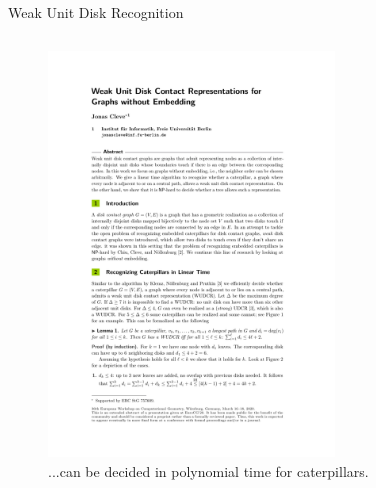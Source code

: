 \documentclass[aspectratio=169,notes]{beamer}
\begin{document}
\begin{frame}{Weak Unit Disk Recognition}

\begin{columns}
\begin{column}{0.4\textwidth}
    \begin{figure}
       \centering
       \includegraphics[width=0.8\textwidth,page=2,viewport=260 695 350 745,clip]{papers/Cleve2020-WUDC.pdf}
       \caption*{...can be decided in polynomial time for caterpillars.}
    \end{figure}
\end{column}
\begin{column}{0.4\textwidth}
\begin{figure}
   \centering

\end{figure}
\end{column}
\end{columns}
\end{frame}
\end{document}
